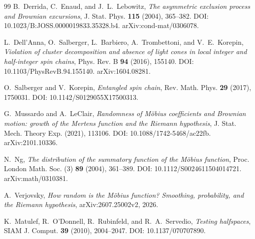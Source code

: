 \documentclass[11pt]{amsart}
\numberwithin{equation}{section}
\theoremstyle{plain}
\theoremstyle{definition}
\theoremstyle{remark}
\begin{document}
\begin{thebibliography}{99}
B.~Derrida, C.~Enaud, and J.~L.~Lebowitz,
\emph{The asymmetric exclusion process and Brownian excursions},
J. Stat. Phys. \textbf{115} (2004), 365--382.
DOI: 10.1023/B:JOSS.0000019833.35328.b4.
arXiv:cond-mat/0306078.

L.~Dell'Anna, O.~Salberger, L.~Barbiero, A.~Trombettoni, and V.~E.~Korepin,
\emph{Violation of cluster decomposition and absence of light cones in local integer and half-integer spin chains},
Phys. Rev. B \textbf{94} (2016), 155140.
DOI: 10.1103/PhysRevB.94.155140.
arXiv:1604.08281.

O.~Salberger and V.~Korepin,
\emph{Entangled spin chain},
Rev. Math. Phys. \textbf{29} (2017), 1750031.
DOI: 10.1142/S0129055X17500313.

G.~Mussardo and A.~LeClair,
\emph{Randomness of M\"obius coefficients and Brownian motion: growth of the Mertens function and the Riemann hypothesis},
J. Stat. Mech. Theory Exp. (2021), 113106.
DOI: 10.1088/1742-5468/ac22fb.
arXiv:2101.10336.

N.~Ng,
\emph{The distribution of the summatory function of the M\"obius function},
Proc. London Math. Soc. (3) \textbf{89} (2004), 361--389.
DOI: 10.1112/S0024611504014721.
arXiv:math/0310381.

A.~Verjovsky,
\emph{How random is the M\"obius function? Smoothing, probability, and the Riemann hypothesis},
arXiv:2607.25002v2, 2026.

K.~Matulef, R.~O'Donnell, R.~Rubinfeld, and R.~A.~Servedio,
\emph{Testing halfspaces},
SIAM J. Comput. \textbf{39} (2010), 2004--2047.
DOI: 10.1137/070707890.

\end{thebibliography}
\end{document}
